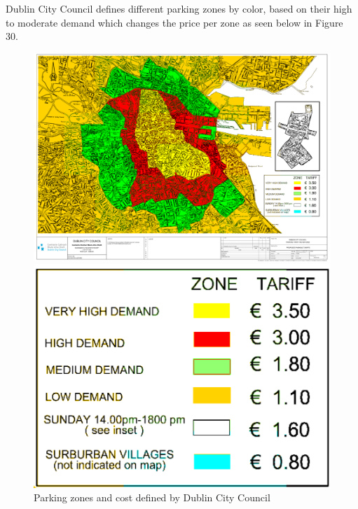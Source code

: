 Dublin City Council defines different parking zones by color, based on their
high to moderate demand which changes the price per zone as seen below in Figure
30.

\begin{figure}[htbp]
  \centering
  \begin{minipage}{0.45\textwidth}
    \centering
    \includegraphics[width=\textwidth]{images/Parking_zones_map.png}
  \end{minipage}
  \hfill
  \begin{minipage}{0.45\textwidth}
    \centering
    \includegraphics[width=\textwidth]{images/Parking_zones_cost.png}
  \end{minipage}
  \caption{Parking zones and cost defined by Dublin City Council}
  \label{fig:Parking_zones}
\end{figure}

